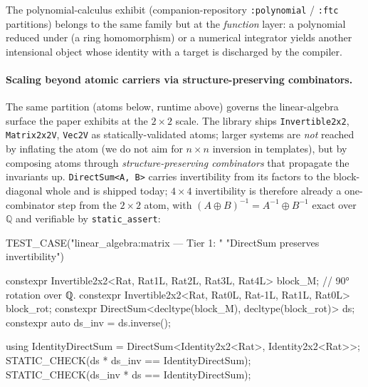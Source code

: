\documentclass[11pt, a4paper]{article}
\begin{document}
The polynomial-calculus exhibit (companion-repository
\texttt{:polynomial} / \texttt{:ftc} partitions) belongs to the same
family but at the \emph{function} layer: a polynomial reduced under
 (a ring homomorphism) or a numerical integrator
yields another intensional object whose identity with a target is
discharged by the compiler.

\paragraph{Scaling beyond atomic carriers via structure-preserving combinators.}
The same partition (atoms below, runtime above) governs the
linear-algebra surface the paper exhibits at the $2 \times 2$ scale.
The library ships \texttt{Invertible2x2}, \texttt{Matrix2x2V},
\texttt{Vec2V} as statically-validated atoms; larger systems are
\emph{not} reached by inflating the atom (we do not aim for
$n \times n$ inversion in templates), but by composing atoms through
\emph{structure-preserving combinators} that propagate the
invariants up.  \texttt{DirectSum<A, B>} carries invertibility from
its factors to the block-diagonal whole and is shipped today;
$4 \times 4$ invertibility is therefore already a one-combinator
step from the $2 \times 2$ atom, with $(A \oplus B)^{-1} =
A^{-1} \oplus B^{-1}$ exact over $\mathbb{Q}$ and verifiable by
\texttt{static\_assert}:

\begin{cpp}
TEST_CASE("linear_algebra:matrix --- Tier 1: "
          "DirectSum preserves invertibility") {
  constexpr Invertible2x2<Rat, Rat{1L}, Rat{2L},
                          Rat{3L}, Rat{4L}> block_M{};
  // 90° rotation over ℚ.
  constexpr Invertible2x2<Rat, Rat{0L}, Rat{-1L},
                          Rat{1L}, Rat{0L}> block_rot{};
  constexpr DirectSum<decltype(block_M),
                      decltype(block_rot)> ds{};
  constexpr auto ds_inv = ds.inverse();

  using IdentityDirectSum =
      DirectSum<Identity2x2<Rat>, Identity2x2<Rat>>;
  STATIC_CHECK(ds * ds_inv == IdentityDirectSum{});
  STATIC_CHECK(ds_inv * ds == IdentityDirectSum{});
}
\end{cpp}
\end{document}
